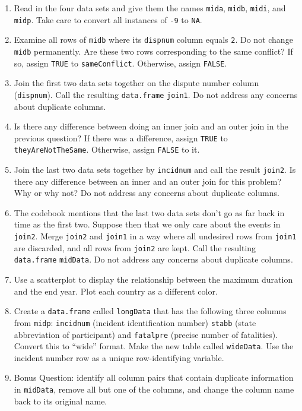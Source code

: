 \documentclass[
  12pt,
  krantz2]{krantz}
\providecommand{\tightlist}{%
  \setlength{\itemsep}{0pt}\setlength{\parskip}{0pt}}
\begin{document}
\begin{enumerate}
\def\labelenumi{\alph{enumi})}
\tightlist
\item
  Read in the four data sets and give them the names \texttt{mida}, \texttt{midb}, \texttt{midi}, and \texttt{midp}. Take care to convert all instances of \texttt{-9} to \texttt{NA}.
\item
  Examine all rows of \texttt{midb} where its \texttt{dispnum} column equals \texttt{2}. Do not change \texttt{midb} permanently. Are these two rows corresponding to the same conflict? If so, assign \texttt{TRUE} to \texttt{sameConflict}. Otherwise, assign \texttt{FALSE}.
\item
  Join the first two data sets together on the dispute number column (\texttt{dispnum}). Call the resulting \texttt{data.frame} \texttt{join1}. Do not address any concerns about duplicate columns.
\item
  Is there any difference between doing an inner join and an outer join in the previous question? If there was a difference, assign \texttt{TRUE} to \texttt{theyAreNotTheSame}. Otherwise, assign \texttt{FALSE} to it.
\item
  Join the last two data sets together by \texttt{incidnum} and call the result \texttt{join2}. Is there any difference between an inner and an outer join for this problem? Why or why not? Do not address any concerns about duplicate columns.
\item
  The codebook mentions that the last two data sets don't go as far back in time as the first two. Suppose then that we only care about the events in \texttt{join2}. Merge \texttt{join2} and \texttt{join1} in a way where all undesired rows from \texttt{join1} are discarded, and all rows from \texttt{join2} are kept. Call the resulting \texttt{data.frame} \texttt{midData}. Do not address any concerns about duplicate columns.
\item
  Use a scatterplot to display the relationship between the maximum duration and the end year. Plot each country as a different color.
\item
  Create a \texttt{data.frame} called \texttt{longData} that has the following three columns from \texttt{midp}: \texttt{incidnum} (incident identification number) \texttt{stabb} (state abbreviation of participant) and \texttt{fatalpre} (precise number of fatalities). Convert this to ``wide'' format. Make the new table called \texttt{wideData}. Use the incident number row as a unique row-identifying variable.
\item
  Bonus Question: identify all column pairs that contain duplicate information in \texttt{midData}, remove all but one of the columns, and change the column name back to its original name.
\end{enumerate}
\end{document}
